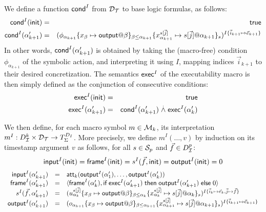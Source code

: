 We define a function $\textsf{cond}^I$ from $\mathcal{D}_{\mathcal{T}}$
to base logic formulas, as follows:
\begin{eqnarray*}
  \mcond^I(\tinit) &=& \true \\
  \mcond^I(\alpha'_{k+1}) &=&
    \interp{\phi_{\alpha_{k+1}}
    \{x_\beta\mapsto\mout@\beta\}_{\beta\leq \alpha_{k+1}}
    \{x_{\alpha_{k+1}}^{s[\vec{j}]}\mapsto
      s[\vec{j}]@\alpha_{k+1}\}_s
    }^{I\{\vec{i}_{k+1}\mapsto\vec{e}_{k+1}\}}
\end{eqnarray*}
In other words, $\textsf{cond}^I(\alpha'_{k+1})$ is obtained by taking the
(macro-free) condition $\phi_{\alpha_{k+1}}$ of the symbolic action, and
interpreting it using $I$, mapping indices $\vec{i}_{k+1}$ to their
desired concretization.
The semantics $\textsf{exec}^I$ of the executability macro is then simply defined as
the conjunction of consecutive conditions:
\begin{eqnarray*}
  \textsf{exec}^I(\mathsf{init}) &=& \textsf{true} \\
  \textsf{exec}^I(\alpha'_{k+1}) &=&
    \textsf{cond}^I(\alpha'_{k+1})
    \stackrel{.}{\wedge}
    \textsf{exec}^I(\alpha'_k)
\end{eqnarray*}

We then define, for each macro symbol $m\in\mathcal{M}_k$,
its interpretation $m^I : D_{\mathcal{I}}^k \times \mathcal{D}_{\mathcal{T}} \to T_\Sigma^{D_I}$.
More precisely, we define $m^I(\ldots,v)$ by induction on its timestamp
argument $v$ as follows, for all $s \in \mathcal{S}_p$ and $\vec{f} \in D_{\mathcal{I}}^p$:
$$
    \textsf{input}^I(\mathsf{init}) = \textsf{frame}^I(\mathsf{init}) = s^I(\vec{f},\mathsf{init})
    = \textsf{output}^I(\mathsf{init}) = 0
$$
$$\begin{array}{rll}
    \minp^I(\alpha'_{k+1}) &=&
    \att_{k}(\mout^I(\alpha'_1),\ldots,\mout^I(\alpha'_k))
  \\
    \mframe^I(\alpha'_{k+1}) &=&
    \langle \mframe^I(\alpha'_k),
    \myif \mexec^I(\alpha'_{k+1}) \mythen \mout^I(\alpha'_{k+1}) \myelse 0
    \rangle
  \\
    s^I(\vec{f},\alpha'_{k+1}) &=&
    \interp{
      u_{\alpha_{k}}^{s[\vec{j}]}
      \{x_\beta\mapsto\mout@\beta\}_{\beta\leq \alpha_{k}}
      \{x_{\alpha_{k}}^{s[\vec{j}]}\mapsto
        s[\vec{j}]@\alpha_{k}\}_s
    }^{
      I\{\vec{i}_k\mapsto\vec{e}_k,\vec{j}\mapsto\vec{f}\}}
  \\
    \mout^I(\alpha'_{k+1}) &=&
      \interp{
        o_{\alpha_{k+1}}
        \{x_\beta\mapsto\mout@\beta\}_{\beta\leq \alpha_{k+1}}
        \{x_{\alpha_{k+1}}^{s[\vec{j}]}\mapsto
          s[\vec{j}]@\alpha_{k+1}\}_s
        }^{I\{\vec{i}_{k+1}\mapsto\vec{e}_{k+1}\}}
\end{array}$$

